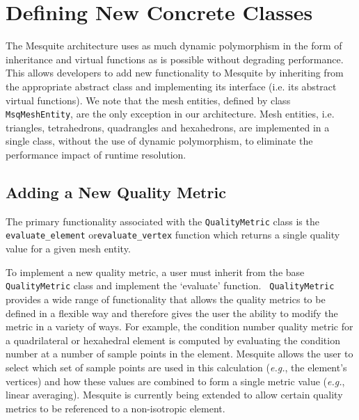 \section{Defining New Concrete Classes}


The Mesquite architecture uses as much dynamic polymorphism in the
form of inheritance and virtual functions as is possible without
degrading performance.  This allows developers to add new
functionality to Mesquite by inheriting from the appropriate abstract
class and implementing its interface (i.e. its abstract virtual
functions).  We note that the mesh entities, defined by class {\tt
MsqMeshEntity}, are the only exception in our architecture.  Mesh
entities, i.e. triangles, tetrahedrons, quadrangles and hexahedrons,
are implemented in a single class, without the use of dynamic
polymorphism, to eliminate the performance impact of runtime
resolution.

\subsection{Adding a New Quality Metric} \label{sec:QualityMetricImpl}

The primary functionality associated with the {\tt QualityMetric}
class is the \texttt{evaluate\_element} or\texttt{evaluate\_vertex}  function which returns a single quality value
for a given mesh entity.

To implement a new quality metric, a user must inherit from the base
\texttt{QualityMetric} class and implement the `evaluate' function.
\texttt{ QualityMetric} provides a wide range of
functionality that allows the quality metrics to be defined in a
flexible way and therefore gives the user the ability to modify the
metric in a variety of ways.  For example, the condition number
quality metric for a quadrilateral or hexahedral element is computed
by evaluating the condition number at a number of sample points in the
element.  Mesquite allows the user to select which set of sample
points are used in this calculation ({\it e.g.}, the element's
vertices) and how these values are combined to form a single metric
value ({\it e.g.}, linear averaging).  Mesquite is currently being
extended to allow certain quality metrics to be referenced to a
non-isotropic element.

